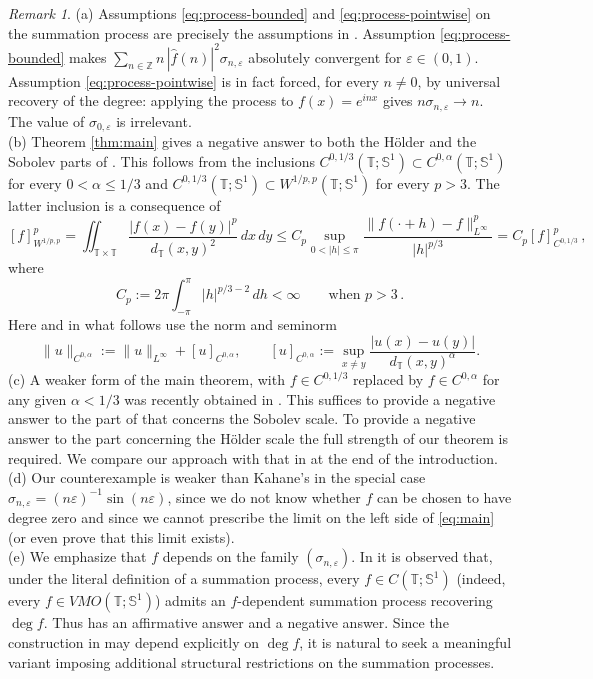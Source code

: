 \documentclass[11pt]{amsart}
\theoremstyle{definition}
\theoremstyle{remark}
\newtheorem{remark}[theorem]{Remark}
\newcommand{\T}{\mathbb T}
\newcommand{\Sone}{\mathbb S^1}
\newcommand{\Z}{\mathbb Z}
\newcommand{\wh}{\widehat}
\DeclareMathOperator{\degmap}{deg}
\begin{document}
\begin{remark}
    (a) Assumptions \eqref{eq:process-bounded} and \eqref{eq:process-pointwise} on the summation process are precisely the assumptions in \cite[Eqs.~(5.11) and (5.12)]{Brezis2023}. Assumption \eqref{eq:process-bounded} makes $\sum_{n\in\Z}n\,|\wh f(n)|^2\sigma_{n,\varepsilon}$ absolutely convergent for $\varepsilon\in(0,1)$. Assumption \eqref{eq:process-pointwise} is in fact forced, for every $n\ne0$, by universal recovery of the degree: applying the process to $f(x)=e^{inx}$ gives $n\sigma_{n,\varepsilon}\to n$. The value of $\sigma_{0,\varepsilon}$ is irrelevant.\\
    (b) Theorem \ref{thm:main} gives a negative answer to both the H\"older and the Sobolev parts of \cite[Open Problem~5.6]{Brezis2023}. This follows from the inclusions $C^{0,1/3}(\T;\Sone)\subset C^{0,\alpha}(\T;\Sone)$ for every $0<\alpha\leq 1/3$ and $C^{0,1/3}(\T;\Sone)\subset W^{1/p,p}(\T;\Sone)$ for every $p>3$. The latter inclusion is a consequence of
    $$
    [f]_{W^{1/p,p}}^p = \iint_{\T\times\T} \frac{|f(x)-f(y)|^p}{d_\T(x,y)^2}\,dx\,dy \leq C_p \sup_{0<|h|\leq\pi} \frac{\|f(\cdot+h)-f\|_{L^\infty}^p}{|h|^{p/3}} = C_p [f]_{C^{0,1/3}}^p \,,
    $$
    where
    $$
    C_p := 2\pi\int_{-\pi}^\pi |h|^{p/3-2}\,dh<\infty \qquad\text{when }p>3 \,.
    $$
    Here and in what follows use the norm and seminorm
    \[
    \|u\|_{C^{0,\alpha}}
    :=\|u\|_{L^\infty}
    +[u]_{C^{0,\alpha}},
    \qquad
    [u]_{C^{0,\alpha}}
    :=\sup_{x\ne y}
    \frac{|u(x)-u(y)|}{d_\T(x,y)^\alpha}.
    \]
    (c) A weaker form of the main theorem, with $f\in C^{0,1/3}$ replaced by $f\in C^{0,\alpha}$ for any given $\alpha<1/3$ was recently obtained in \cite{Cieszynski2026}. This suffices to provide a negative answer to the part of \cite[Open Problem~5.6]{Brezis2023} that concerns the Sobolev scale. To provide a negative answer to the part concerning the H\"older scale the full strength of our theorem is required. We compare our approach with that in \cite{Cieszynski2026} at the end of the introduction.\\
    (d) Our counterexample is weaker than Kahane's \cite[Proposition~P4]{Kahane2005} in the special case $\sigma_{n,\varepsilon} = (n\varepsilon)^{-1} \sin(n\varepsilon)$, since we do not know whether $f$ can be chosen to have degree zero and since we cannot prescribe the limit on the left side of \eqref{eq:main} (or even prove that this limit exists).\\
    (e) We emphasize that $f$ depends on the family $(\sigma_{n,\varepsilon})$. In \cite{Cieszynski2026} it is observed that, under the literal definition of a summation process, every $f\in C(\T;\Sone)$ (indeed, every $f\in VMO(\T;\Sone)$) admits an $f$-dependent summation process recovering $\degmap f$. Thus \cite[Open Problem~5.7]{Brezis2023} has an affirmative answer and \cite[Open Problem~5.8]{Brezis2023} a negative answer. Since the construction in \cite{Cieszynski2026} may depend explicitly on $\degmap f$, it is natural to seek a meaningful variant imposing additional structural restrictions on the summation processes.
\end{remark}
\end{document}
